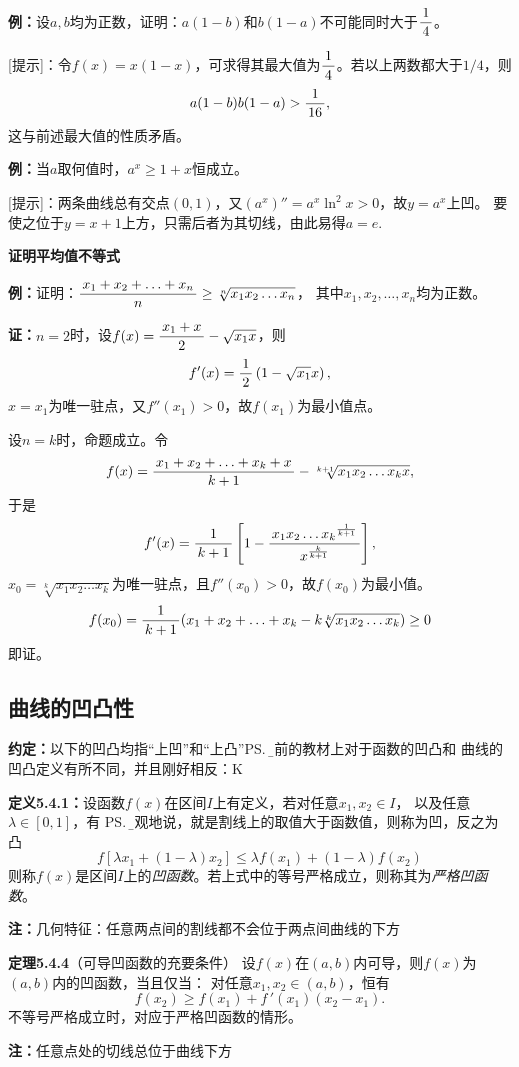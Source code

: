 {\bf 例：}设$a,b$均为正数，证明：$a(1-b)$和$b(1-a)$不可能同时大于$\displaystyle\frac{\,{1}\,}{\,{4}\,}$。

[提示]：令$f(x)=x(1-x)$，可求得其最大值为$\displaystyle\frac{\,{1}\,}{\,{4}\,}$。若以上两数都大于$1/4$，则
$$a(1-b)b(1-a)>\displaystyle\frac{\,{1}\,}{\,{16}\,},$$
这与前述最大值的性质矛盾。

{\bf 例：}当$a$取何值时，$a^x\geq1+x$恒成立。

[提示]：两条曲线总有交点$(0,1)$，又$(a^x)''=a^x\ln^2x>0$，故$y=a^x$上凹。
要使之位于$y=x+1$上方，只需后者为其切线，由此易得$a=e$.

\begin{shaded}
{\bf 证明平均值不等式}

{\bf 例：}证明：$\displaystyle\frac{\,{x_1+x_2+\ldots+x_n}\,}{\,{n}\,}\geq\sqrt[n]{x_1x_2\ldots x_n}$，
其中$x_1,x_2,\ldots,x_n$均为正数。

{\bf 证：}$n=2$时，设$f(x)=\displaystyle\frac{\,{x_1+x}\,}{\,{2}\,}-\sqrt{x_1x}$，则
$$f'(x)=\displaystyle\frac{\,{1}\,}{\,{2}\,}\left(1-\sqrt{x_1}x\right),$$
$x=x_1$为唯一驻点，又$f''(x_1)>0$，故$f(x_1)$为最小值点。

设$n=k$时，命题成立。令
$$f(x)=\displaystyle\frac{\,{x_1+x_2+\ldots+x_k+x}\,}{\,{k+1}\,}-\sqrt[k+1]{x_1x_2\ldots x_kx},$$
于是
$$f'(x)=\displaystyle\frac{\,{1}\,}{\,{k+1}\,}\left[1-\displaystyle\frac{\,{{x_1x_2\ldots x_k}^{\frac1{k+1}}}\,}{\,{x^{\frac k{k+1}}}\,}\right],$$
$x_0=\sqrt[k]{x_1x_2\ldots x_k}$为唯一驻点，且$f''(x_0)>0$，故$f(x_0)$为最小值。
$$f(x_0)=\displaystyle\frac{\,{1}\,}{\,{k+1}\,}(x_1+x_2+\ldots+x_k-k\sqrt[k]{x_1x_2\ldots x_k})\geq 0$$
即证。
\end{shaded}

\subsection{曲线的凹凸性}

{\bf 约定：}以下的凹凸均指“上凹”和“上凸”\ps{\b 目前的教材上对于函数的凹凸和
曲线的凹凸定义有所不同，并且刚好相反：K}

{\bf 定义5.4.1：}设函数$f(x)$在区间$I$上有定义，若对任意$x_1,x_2\in I$，
以及任意$\lambda\in[0,1]$，有
\ps{\b 直观地说，就是割线上的取值大于函数值，则称为凹，反之为凸}
$$f[\lambda x_1+(1-\lambda)x_2]\leq\lambda f(x_1)+(1-\lambda)f(x_2)$$
则称$f(x)$是区间$I$上的{\it 凹函数}。若上式中的等号严格成立，则称其为{\it 严格凹函数}。

{\bf 注：}几何特征：任意两点间的割线都不会位于两点间曲线的下方

{\bf 定理5.4.4}（可导凹函数的充要条件）
设$f(x)$在$(a,b)$内可导，则$f(x)$为$(a,b)$内的凹函数，当且仅当：
对任意$x_1,x_2\in(a,b)$，恒有
$$f(x_2)\geq f(x_1)+f\,'(x_1)(x_2-x_1). $$
不等号严格成立时，对应于严格凹函数的情形。

{\bf 注：}{任意点处的切线总位于曲线下方}

